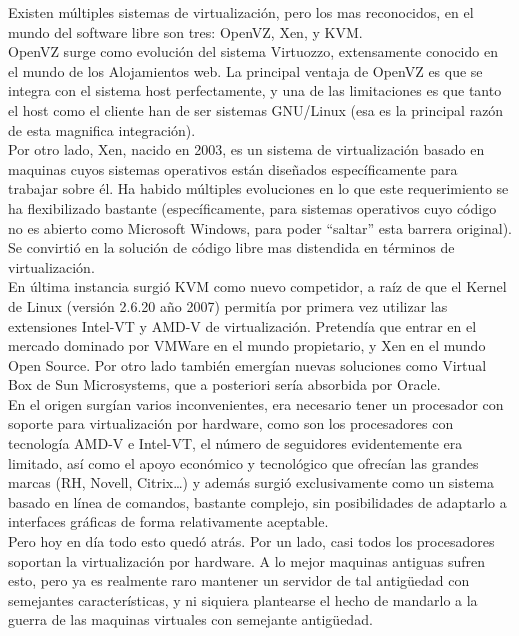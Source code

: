 Existen múltiples sistemas de virtualización, pero los mas reconocidos, en el mundo del software libre son tres: OpenVZ, Xen, y KVM. \\

OpenVZ surge como evolución del sistema Virtuozzo, extensamente conocido en el mundo de los Alojamientos web. La principal ventaja de OpenVZ es que se integra con el sistema host perfectamente, y una de las limitaciones es que tanto el host como el cliente han de ser sistemas GNU/Linux (esa es la principal razón de esta magnifica integración).  \\

Por otro lado, Xen, nacido en 2003, es un sistema de virtualización basado en maquinas cuyos sistemas operativos están diseñados específicamente para trabajar sobre él. Ha habido múltiples evoluciones en lo que este requerimiento se ha flexibilizado bastante (específicamente, para sistemas operativos cuyo código no es abierto como Microsoft Windows, para poder “saltar” esta barrera original). Se convirtió en la solución de código libre mas distendida en términos de virtualización.\\

En última instancia surgió KVM como nuevo competidor, a raíz de que el Kernel de Linux (versión 2.6.20 año 2007) permitía por primera vez utilizar las extensiones Intel-VT y AMD-V de virtualización. Pretendía que entrar en el mercado dominado por VMWare en el mundo propietario, y Xen en el mundo Open Source. Por otro lado también emergían nuevas soluciones como Virtual Box de Sun Microsystems, que a posteriori sería absorbida por Oracle.\\

En el origen surgían varios inconvenientes, era necesario tener un procesador con soporte para virtualización por hardware, como son los procesadores con tecnología AMD-V e Intel-VT, el número de seguidores evidentemente era limitado, así como el apoyo económico y tecnológico que ofrecían las grandes marcas (RH, Novell, Citrix…) y además surgió exclusivamente como un sistema basado en línea de comandos, bastante complejo, sin posibilidades de adaptarlo a interfaces gráficas de forma relativamente aceptable. \\

Pero hoy en día todo esto quedó atrás. Por un lado, casi todos los procesadores soportan la virtualización por hardware. A lo mejor maquinas antiguas sufren esto, pero ya es realmente raro mantener un servidor de tal antigüedad con semejantes características, y ni siquiera plantearse el hecho de mandarlo a la guerra de las maquinas virtuales con semejante antigüedad.\\

